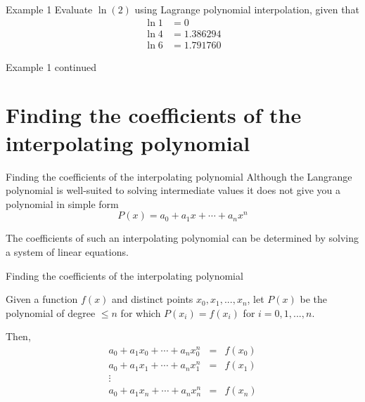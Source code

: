 \documentclass[12pt]{beamer}
\begin{document}
\begin{frame}{Example 1}
Evaluate $\ln(2)$ using Lagrange polynomial interpolation, given that
\begin{align*}
\ln{1} &= 0 \\
\ln 4 &= 1.386294 \\
\ln 6 &= 1.791760
\end{align*}
\vspace{2 in}
\end{frame}

\begin{frame}{Example 1 continued}
\end{frame}

\section{Finding the coefficients of the interpolating polynomial} 

\begin{frame}{Finding the coefficients of the interpolating polynomial} 
Although the Langrange polynomial is well-suited to solving intermediate values it does not give you a polynomial in simple form
\[
P(x) = a_0 + a_1x + \dotsm + a_nx^n
\]

The coefficients of such an interpolating polynomial can be determined by solving a system of linear equations.

\end{frame} 

\begin{frame}{Finding the coefficients of the interpolating polynomial} 

Given a function $f(x)$ and distinct points $x_0, x_1, ..., x_n$, let $P(x)$ be the polynomial of degree $\leq n$ for which $P(x_i) = f(x_i)$ for $i=0,1,...,n$.

Then,
\begin{eqnarray*}
a_0 + a_1x_0 + \dotsb + a_nx_0^n &=& f(x_0) \\
a_0 + a_1x_1 + \dotsb + a_nx_1^n &=& f(x_1) \\
\vdots \\
a_0 + a_1x_n + \dotsb + a_nx_n^n &=& f(x_n)
\end{eqnarray*}
\end{frame} 
\end{document}
